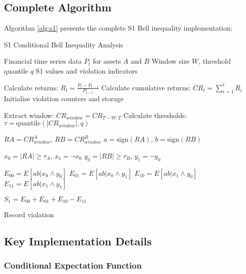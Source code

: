 \documentclass[11pt,a4paper]{article}
\begin{document}
\subsection{Complete Algorithm}

Algorithm \ref{alg:s1} presents the complete S1 Bell inequality implementation:

\begin{algorithm}
\caption{S1 Conditional Bell Inequality Analysis}
\label{alg:s1}
\begin{algorithmic}[1]
\REQUIRE Financial time series data $P_t$ for assets $A$ and $B$
\REQUIRE Window size $W$, threshold quantile $q$
\ENSURE S1 values and violation indicators

\STATE Calculate returns: $R_t = \frac{P_t - P_{t-1}}{P_{t-1}}$
\STATE Calculate cumulative returns: $CR_t = \sum_{i=1}^{t} R_i$
\STATE Initialize violation counters and storage

    \STATE Extract window: $CR_{window} = CR_{T-W:T}$
    \STATE Calculate thresholds: $\tau = \text{quantile}(|CR_{window}|, q)$
    
        \STATE $RA = CR_{window}^A$, $RB = CR_{window}^B$
        \STATE $a = \text{sign}(RA)$, $b = \text{sign}(RB)$
        
        \STATE $x_0 = |RA| \geq \tau_A$, $x_1 = \neg x_0$
        \STATE $y_0 = |RB| \geq \tau_B$, $y_1 = \neg y_0$
        
        \STATE $E_{00} = E[ab | x_0 \land y_0]$
        \STATE $E_{01} = E[ab | x_0 \land y_1]$
        \STATE $E_{10} = E[ab | x_1 \land y_0]$
        \STATE $E_{11} = E[ab | x_1 \land y_1]$
        
        \STATE $S_1 = E_{00} + E_{01} + E_{10} - E_{11}$
        
            \STATE Record violation
        \ENDIF
    \ENDFOR
\ENDFOR
\end{algorithmic}
\end{algorithm}

\subsection{Key Implementation Details}

\subsubsection{Conditional Expectation Function}
\end{document}
